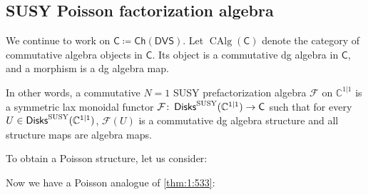 \documentclass[final,reqno]{amsart}
\numberwithin{equation}{section}
\theoremstyle{definition}
\newtheorem{dfn}[thm]{Definition}
\newcommand{\ceq}{\coloneqq} %
\newcommand{\lto}{\longrightarrow}
\newcommand{\SUSY}{\textup{SUSY}}
\newcommand{\sC}{\mathbb{C}^{1|1}}
\newcommand{\clF}{\mathcal{F}}
\newcommand{\sfC}{\mathsf{C}}
\newcommand{\Ch}{\mathsf{Ch}}
\newcommand{\DVS}{\mathsf{DVS}}
\DeclareMathOperator{\CAlg}{CAlg}
\DeclareMathOperator{\Disk}{\mathsf{Disks}}
\begin{document}
\subsection{SUSY Poisson factorization algebra}

We continue to work on $\sfC \ceq \Ch(\DVS)$.
Let $\CAlg(\sfC)$ denote the category of commutative algebra objects in $\sfC$.
Its object is a commutative dg algebra in $\sfC$, 
and a morphism is a dg algebra map.
 

In other words, a commutative $N=1$ SUSY prefactorization algebra $\clF$ 
on $\sC$ is a symmetric lax monoidal functor 
$\clF\colon \Disk^{\SUSY}(\sC) \to \sfC$
such that for every $U\in\Disk^{\SUSY}(\sC)$, 
$\clF(U)$ is a commutative dg algebra structure
and all structure maps are algebra maps.


To obtain a Poisson structure, let us consider:


Now we have a Poisson analogue of \cref{thm:1:533}:
\end{document}
